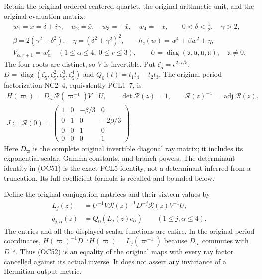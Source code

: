 Retain the original ordered centered quartet, the original arithmetic unit,
and the original evaluation matrix:
\[
 \begin{gathered}
 w_1=x=\delta+i\gamma,\quad w_2=\bar x,\quad
 w_3=-\bar x,\quad w_4=-x,\qquad 0<\delta<\tfrac12,\quad\gamma>2,\\
 \beta=2(\gamma^2-\delta^2),\quad\eta=(\delta^2+\gamma^2)^2,
 \qquad h_c(w)=w^4+\beta w^2+\eta,\\
 V_{\alpha,r+1}=w_\alpha^r\quad(1\le\alpha\le4,\ 0\le r\le3),
 \qquad U=\operatorname{diag}(\mathfrak u,\overline{\mathfrak u},
                    \overline{\mathfrak u},\mathfrak u),\quad\mathfrak u\ne0.
 \end{gathered}\tag{OC50}\label{hzoc:eq:OC50}
\]
The four roots are distinct, so $V$ is invertible. Put
$\zeta_5=e^{2\pi i/5}$,
$D=\operatorname{diag}(\zeta_5,\zeta_5^2,\zeta_5^3,\zeta_5^4)$ and
$Q_0(t)=t_1t_4-t_2t_3$. The original period factorization NC2--4,
equivalently PCL1--7, is
\[
 \begin{gathered}
 H(\varpi)=D_\varpi\mathcal R(\varpi^{-1})V^{-1}U,
 \qquad \det\mathcal R(z)=1,\qquad
 \mathcal R(z)^{-1}=\operatorname{adj}\mathcal R(z),\\
 J:=\mathcal R(0)=
 \begin{pmatrix}1&0&-\beta/3&0\\0&1&0&-2\beta/3\\
 0&0&1&0\\0&0&0&1\end{pmatrix}.
 \end{gathered}\tag{OC51}\label{hzoc:eq:OC51}
\]
Here $D_\varpi$ is the complete original invertible diagonal ray matrix;
it includes its exponential scalar, Gamma constants, and branch powers.
The determinant identity in (OC51) is the exact PCL5 identity, not a
determinant inferred from a truncation. Its full coefficient formula is
recalled and bounded below.

Define the original conjugation matrices and their sixteen values by
\[
 \begin{split}
 L_j(z)&=U^{-1}V\mathcal R(z)^{-1}D^{-j}\mathcal R(z)V^{-1}U,\\
 q_{j,\alpha}(z)&=Q_0(L_j(z)e_\alpha)
       \qquad(1\le j,\alpha\le4).
 \end{split}\tag{OC52}\label{hzoc:eq:OC52}
\]
The entries and all the displayed scalar functions are entire. In the
original period coordinates,
$H(\varpi)^{-1}D^{-j}H(\varpi)=L_j(\varpi^{-1})$ because
$D_\varpi$ commutes with $D^{-j}$. Thus (OC52) is an equality of the
original maps with every ray factor cancelled against its actual inverse.
It does not assert any invariance of a Hermitian output metric.

